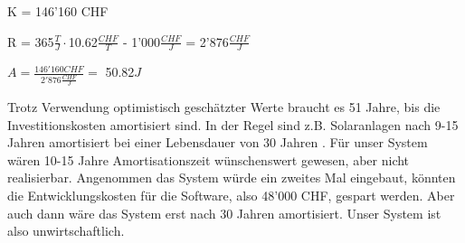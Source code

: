 \bigskip
K = 146'160 CHF

\bigskip
R = 365$\tfrac{T}{J}\cdot$10.62$\tfrac{CHF}{T}$ - 1'000$\tfrac{CHF}{J}$ = 2'876$\tfrac{CHF}{J}$

\bigskip
$A = \tfrac{146'160CHF}{2'876 \tfrac{CHF}{J}} =$ 50.82$J$

\bigskip
Trotz Verwendung optimistisch geschätzter Werte braucht es 51 Jahre, bis die Investitionskosten amortisiert sind. In der Regel sind z.B. Solaranlagen nach 9-15 Jahren amortisiert bei einer Lebensdauer von 30 Jahren \cite{helion}. Für unser System wären 10-15 Jahre Amortisationszeit wünschenswert gewesen, aber nicht realisierbar.
Angenommen das System würde ein zweites Mal eingebaut, könnten die Entwicklungskosten für die Software, also 48'000 CHF, gespart werden. Aber auch dann wäre das System erst nach 30 Jahren amortisiert. Unser System ist also unwirtschaftlich.